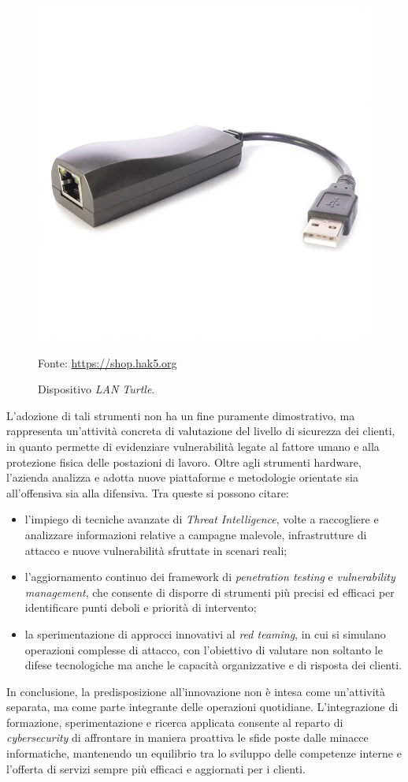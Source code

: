\begin{itemize}
\begin{figure}[H]
    \includegraphics[alt={LAN Turtle}, width=0.8\columnwidth]{img/lan-turtle_2000x.jpg}
    \caption{Dispositivo \textit{LAN Turtle}.}
    Fonte: \url{https://shop.hak5.org}
    \label{fig:lan-turtle}
    \end{figure}
\end{itemize}
L'adozione di tali strumenti non ha un fine puramente dimostrativo, ma rappresenta un'attività concreta di valutazione del livello di sicurezza dei clienti, in quanto permette di evidenziare vulnerabilità legate al fattore umano e alla protezione fisica delle postazioni di lavoro.  
Oltre agli strumenti hardware, l'azienda analizza e adotta nuove piattaforme e metodologie orientate sia all'offensiva sia alla difensiva. Tra queste si possono citare:
\begin{itemize}
    \item l'impiego di tecniche avanzate di \textit{Threat Intelligence}, volte a raccogliere e analizzare informazioni relative a campagne malevole, infrastrutture di attacco e nuove vulnerabilità sfruttate in scenari reali;
    \item l'aggiornamento continuo dei framework di \textit{penetration testing} e \textit{vulnerability management}, che consente di disporre di strumenti più precisi ed efficaci per identificare punti deboli e priorità di intervento;
    \item la sperimentazione di approcci innovativi al \textit{red teaming}, in cui si simulano operazioni complesse di attacco, con l'obiettivo di valutare non soltanto le difese tecnologiche ma anche le capacità organizzative e di risposta dei clienti.
\end{itemize}
In conclusione, la predisposizione all'innovazione non è intesa come un'attività separata, ma come parte integrante delle operazioni quotidiane. L'integrazione di formazione, sperimentazione e ricerca applicata consente al reparto di \textit{cybersecurity} di affrontare in maniera proattiva le sfide poste dalle minacce informatiche, mantenendo un equilibrio tra lo sviluppo delle competenze interne e l'offerta di servizi sempre più efficaci e aggiornati per i clienti.
